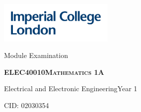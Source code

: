 \documentclass[a4, 12pt]{article}
\newcommand{\documenttype}{Module Examination}
\newcommand{\modulecode}{ELEC40010}
\newcommand{\modulename}{Mathematics 1A}
\newcommand{\cid}{02030354}
\newcommand{\degreeyear}{1}
\newcommand{\degree}{Electrical and Electronic Engineering}
\begin{document}
\thispagestyle{empty}
\includegraphics[height=2cm]{IMP_ML_1CS_4CP_CLEAR-SPACE.png}
    \vspace{4cm}
    \begin{center}
        \LARGE \documenttype
    \end{center}
    \vspace{1cm}
    \begin{center}
        \textsc{\LARGE \bfseries \modulecode \quad \modulename}
    \end{center}
    \begin{center}
        {\Large \degree \quad Year \degreeyear}
    \end{center}
    \vspace{1cm}
    \begin{center}
        {\Large CID: \cid}
    \end{center}
\end{document}
